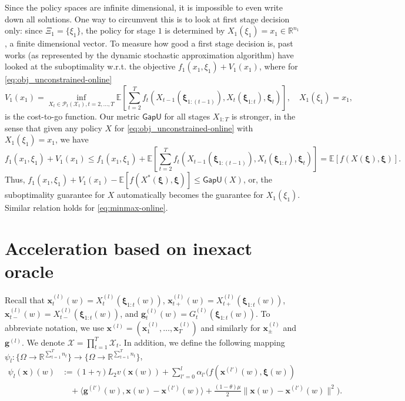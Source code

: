 \documentclass[11pt,fullpage,letterpaper]{article}
\newcommand{\mc}{\mathcal}
\newcommand{\mb}{\mathbf}
\newcommand{\R}{\mathbb{R}}
\newcommand{\E}{\mathbb{E}}
\newcommand{\bx}{\boldsymbol{\xi}}
\newcommand{\gapu}{\mathsf{GapU}}
\begin{document}
Since the policy spaces are infinite dimensional, it is impossible to even write down all solutions. One way to circumvent this is to look at first stage decision only: since $\Xi_1 = \{\xi_1\}$, the policy for stage $1$ is determined by $X_1(\xi_1)=x_1\in \R^{n_1}$, a finite dimensional vector. To measure how good a first stage decision is, past works (as represented by the dynamic stochastic approximation algorithm) have looked at the suboptimality w.r.t. the objective $f_1(x_1,\xi_1) + V_1(x_1)$, where for \eqref{eq:obj_unconstrained-online}
\begin{displaymath}
    V_1(x_1)=\inf_{X_t\in \mc P_t(\mc X_t),t=2,\ldots,T}\E[\sum_{t=2}^Tf_t(X_{t-1}(\bx_{1:(t-1)}),X_t(\bx_{1:t}),\bx_t)], \quad X_1(\xi_1) = x_1, 
\end{displaymath}
is the cost-to-go function. Our metric $\gapu$ for all stages $X_{1:T}$ is stronger, in the sense that given any policy $X$ for \eqref{eq:obj_unconstrained-online} with $X_1(\xi_1) = x_1$, we have  
\begin{displaymath}
    f_1(x_1,\xi_1) + V_1(x_1) \leq f_1(x_1,\xi_1) + \E[\sum_{t=2}^Tf_t(X_{t-1}(\bx_{1:(t-1)}),X_t(\bx_{1:t}),\bx_t)] = \E[f(X(\bx),\bx)].
\end{displaymath}
Thus, $f_1(x_1,\xi_1) + V_1(x_1) - \E[f(X^*(\bx),\bx)]\leq \gapu(X)$, or, the suboptimality guarantee for $X$ automatically becomes the guarantee for $X_1(\xi_1)$. Similar relation holds for \eqref{eq:minmax-online}. 










\section{Acceleration based on inexact oracle}\label{appendix:acc}

Recall that $\mb x_t^{(l)}(w) = X_t^{(l)}(\bx_{1:t}(w))$, $\mb x_{t+}^{(l)}(w) = X_{t+}^{(l)}(\bx_{1:t}(w))$, $\mb x_{t-}^{(l)}(w) = X_{t-}^{(l)}(\bx_{1:t}(w))$, and $\mb g_t^{(l)}(w) = G_t^{(l)}(\bx_{1:t}(w))$. To abbreviate notation, we use $\mb x^{(l)} = (\mb x^{(l)}_1,\ldots,\mb x_T^{(l)})$ and similarly for $\mb x^{(l)}_{\pm}$ and $\mb g^{(l)}$. We denote $\mc X = \prod_{t=1}^T \mc X_t$. In addition, we define the following mapping $\psi_l:\{\Omega\to \R^{\sum_{t=1}^T n_t}\}\to \{\Omega\to \R^{\sum_{t=1}^T n_t}\}$,
\begin{align*}
    \psi_{l}(\mb x)(w)&:= (1+\gamma)L_2v(\mb x(w)
    ) + \sum_{l'=0}^{l} \alpha_{l'}(f(\mb x^{(l')}(w),\bx(w)) \\
    &\quad +\langle \mb g^{(l')}(w),\mb x(w)-\mb x^{(l')}(w)\rangle + \frac{(1-\theta)\mu}{2}\|\mb x(w)-\mb x^{(l')}(w)\|^2).
\end{align*}
\end{document}
